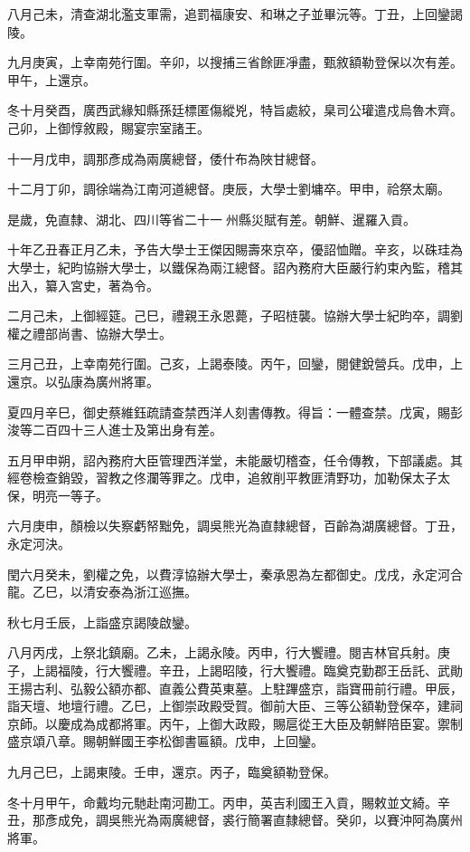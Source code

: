 \begin{pinyinscope}
八月己未，清查湖北濫支軍需，追罰福康安、和琳之子並畢沅等。丁丑，上回鑾謁陵。

九月庚寅，上幸南苑行圍。辛卯，以搜捕三省餘匪凈盡，甄敘額勒登保以次有差。甲午，上還京。

冬十月癸酉，廣西武緣知縣孫廷標匿傷縱兇，特旨處絞，臬司公瓘遣戍烏魯木齊。己卯，上御惇敘殿，賜宴宗室諸王。

十一月戊申，調那彥成為兩廣總督，倭什布為陜甘總督。

十二月丁卯，調徐端為江南河道總督。庚辰，大學士劉墉卒。甲申，祫祭太廟。

是歲，免直隸、湖北、四川等省二十一州縣災賦有差。朝鮮、暹羅入貢。

十年乙丑春正月乙未，予告大學士王傑因賜壽來京卒，優詔恤贈。辛亥，以硃珪為大學士，紀昀協辦大學士，以鐵保為兩江總督。詔內務府大臣嚴行約束內監，稽其出入，纂入宮史，著為令。

二月己未，上御經筵。己巳，禮親王永恩薨，子昭梿襲。協辦大學士紀昀卒，調劉權之禮部尚書、協辦大學士。

三月己丑，上幸南苑行圍。己亥，上謁泰陵。丙午，回鑾，閱健銳營兵。戊申，上還京。以弘康為廣州將軍。

夏四月辛巳，御史蔡維鈺疏請查禁西洋人刻書傳教。得旨：一體查禁。戊寅，賜彭浚等二百四十三人進士及第出身有差。

五月甲申朔，詔內務府大臣管理西洋堂，未能嚴切稽查，任令傳教，下部議處。其經卷檢查銷毀，習教之佟瀾等罪之。戊申，追敘削平教匪清野功，加勒保太子太保，明亮一等子。

六月庚申，顏檢以失察虧帑黜免，調吳熊光為直隸總督，百齡為湖廣總督。丁丑，永定河決。

閏六月癸未，劉權之免，以費淳協辦大學士，秦承恩為左都御史。戊戌，永定河合龍。乙巳，以清安泰為浙江巡撫。

秋七月壬辰，上詣盛京謁陵啟鑾。

八月丙戌，上祭北鎮廟。乙未，上謁永陵。丙申，行大饗禮。閱吉林官兵射。庚子，上謁福陵，行大饗禮。辛丑，上謁昭陵，行大饗禮。臨奠克勤郡王岳託、武勛王揚古利、弘毅公額亦都、直義公費英東墓。上駐蹕盛京，詣寶冊前行禮。甲辰，詣天壇、地壇行禮。乙巳，上御崇政殿受賀。御前大臣、三等公額勒登保卒，建祠京師。以慶成為成都將軍。丙午，上御大政殿，賜扈從王大臣及朝鮮陪臣宴。禦制盛京頌八章。賜朝鮮國王李松御書匾額。戊申，上回鑾。

九月己巳，上謁東陵。壬申，還京。丙子，臨奠額勒登保。

冬十月甲午，命戴均元馳赴南河勘工。丙申，英吉利國王入貢，賜敕並文綺。辛丑，那彥成免，調吳熊光為兩廣總督，裘行簡署直隸總督。癸卯，以賽沖阿為廣州將軍。


\end{pinyinscope}
